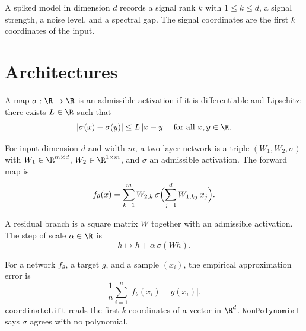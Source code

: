 \begin{definition}\label{def:spiked_model}
\leanok
{}
A spiked model in dimension $d$ records a signal rank $k$ with $1\le k\le d$, a signal strength, a noise level, and a spectral gap. The signal coordinates are the first $k$ coordinates of the input.
\end{definition}

\chapter{Architectures}

\begin{definition}\label{def:activation}
\leanok
A map $\sigma:\R\to\R$ is an admissible activation if it is differentiable and Lipschitz: there exists $L\in\R$ such that
\[
|\sigma(x)-\sigma(y)| \le L\,|x-y|
\quad\text{for all }x,y\in\R.
\]
\end{definition}

\begin{definition}\label{def:two_layer_net}
\leanok
{}
For input dimension $d$ and width $m$, a two-layer network is a triple $(W_1,W_2,\sigma)$ with $W_1\in\R^{m\times d}$, $W_2\in\R^{1\times m}$, and $\sigma$ an admissible activation. The forward map is
\[
f_\theta(x)
=
\sum_{k=1}^m W_{2,k}\,
\sigma\Bigl(\sum_{j=1}^d W_{1,kj}\,x_j\Bigr).
\]
\end{definition}

\begin{definition}\label{def:residual}
\leanok
{}
A residual branch is a square matrix $W$ together with an admissible activation. The step of scale $\alpha\in\R$ is
\[
h \mapsto h + \alpha\,\sigma(Wh).
\]
\end{definition}

\begin{definition}\label{def:approx_error}
\leanok
{}
For a network $f_\theta$, a target $g$, and a sample $(x_i)$, the empirical approximation error is
\[
\frac1n\sum_{i=1}^n \bigl|f_\theta(x_i)-g(x_i)\bigr|.
\]
$\mathtt{coordinateLift}$ reads the first $k$ coordinates of a vector in $\R^d$. $\mathtt{NonPolynomial}$ says $\sigma$ agrees with no polynomial.
\end{definition}


